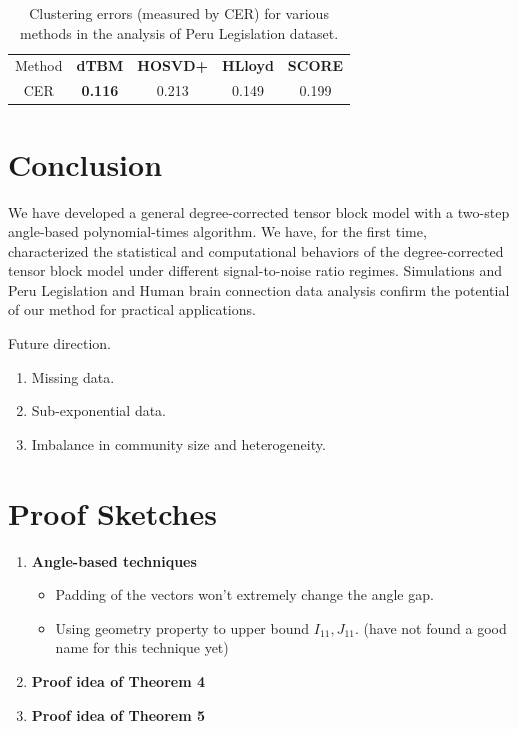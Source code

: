 \documentclass[lettersize,journal]{IEEEtran}
\theoremstyle{definition}
\theoremstyle{definition}
\begin{document}
\begin{table}[ht]
    \centering
    \begin{tabular}{c |c  c c c}
    \hline
        Method & \textbf{\small dTBM} 
        &\textbf{\small HOSVD+} & \textbf{\small HLloyd} &  \textbf{\small SCORE}\\
         CER & \textbf{0.116}
         &0.213 & 0.149 &0.199\\
         \hline
    \end{tabular}
    \caption{Clustering errors (measured by CER) for various methods in the analysis of Peru Legislation dataset.}
    \label{tab:peru}
\end{table}

\section{Conclusion}
We have developed a general degree-corrected tensor block model with a two-step angle-based polynomial-times algorithm. We have, for the first time, characterized the statistical and computational behaviors of the degree-corrected tensor block model under different signal-to-noise ratio regimes. Simulations and Peru Legislation and Human brain connection data analysis confirm the potential of our method for practical applications.

{\color{red}
Future direction. 
\begin{enumerate}
    \item Missing data.
    \item Sub-exponential data.
    \item Imbalance in community size and heterogeneity.
\end{enumerate}
}



{
\color{red}

\section{Proof Sketches}

\begin{enumerate}
\item \textbf{Angle-based techniques} 
\begin{itemize}
    \item Padding of the vectors won't extremely change the angle gap. 
    \item Using geometry property to upper bound $I_{11}, J_{11}$. (have not found a good name for this technique yet)
\end{itemize}
    \item \textbf{Proof idea of Theorem 4}
    \item \textbf{Proof idea of Theorem 5}
\end{enumerate}

}
\end{document}
